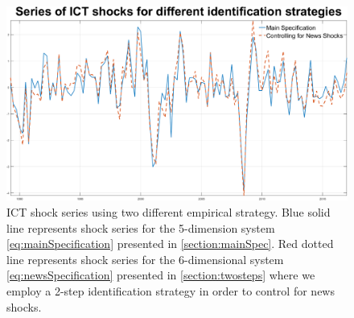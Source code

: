 \documentclass[12pt]{article}
\begin{document}
 	\begin{figure}[h!]
	\begin{center}
		\includegraphics[scale=0.35]{MainFigures/ICTshocksSeries_ControllingforNEWS}
		\caption{ICT shock series using two different empirical strategy. Blue solid line represents shock series for the 5-dimension system \ref{eq:mainSpecification} presented in \ref{section:mainSpec}. Red dotted line represents shock series for the 6-dimensional system \ref{eq:newsSpecification} presented in \ref{section:twosteps} where we employ a 2-step identification strategy in order to control for news shocks.}
		\label{fig:shockSeries_2steps}
	\end{center} 
\end{figure}
 


 
\end{document}
